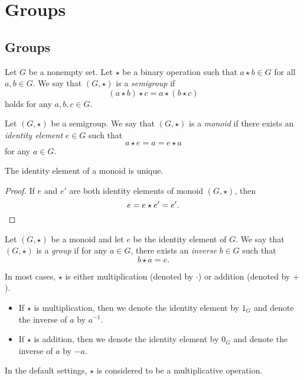 \chapter{Groups}
\section{Groups}
\begin{definition}
  Let $G$ be a nonempty set.
  Let $\star$ be a binary operation such that $a \star b \in G$ for all
  $a, b \in G$.
  We say that $(G, \star)$ is a \emph{semigroup} if
  \begin{equation*}
    (a \star b) \star c = a \star (b \star c)
  \end{equation*}
  holds for any $a, b, c \in G$.
\end{definition}

\begin{definition}
  Let $(G, \star)$ be a semigroup.
  We say that $(G, \star)$ is a \emph{monoid} if there exists an \emph{identity
  element} $e \in G$ such that
  \begin{equation*}
    a \star e = a = e \star a
  \end{equation*}
  for any $a \in G$.
\end{definition}

\begin{theorem}
  The identity element of a monoid is unique.
\end{theorem}
\begin{proof}
  If $e$ and $e'$ are both identity elements of monoid $(G, \star)$, then
  \begin{equation*}
    e = e \star e' = e'.
    \qedhere
  \end{equation*}
\end{proof}

\begin{definition}
  Let $(G, \star)$ be a monoid and let $e$ be the identity element of $G$.
  We say that $(G, \star)$ is a \emph{group} if for any $a \in G$, there exists
  an \emph{inverse} $b \in G$ such that
  \begin{equation*}
    b \star a = e.
  \end{equation*}
\end{definition}
\begin{remark}
  In most cases, $\star$ is either multiplication (denoted by $\cdot$) or
  addition (denoted by $+$).
  \begin{itemize}
    \item If $\star$ is multiplication, then we denote the identity element by
    $1_G$ and denote the inverse of $a$ by $a^{-1}$.
    \item If $\star$ is addition, then we denote the identity element by $0_G$
    and denote the inverse of $a$ by $-a$.
  \end{itemize}
  In the default settings, $\star$ is considered to be a multiplicative
  operation.
\end{remark}

